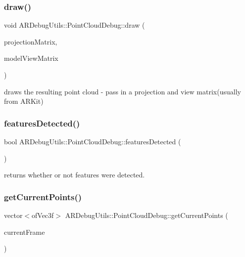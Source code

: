 \subsubsection{\texorpdfstring{draw()}{draw()}}
{\footnotesize\ttfamily void A\+R\+Debug\+Utils\+::\+Point\+Cloud\+Debug\+::draw (\begin{DoxyParamCaption}\item[{of\+Matrix4x4}]{projection\+Matrix,  }\item[{of\+Matrix4x4}]{model\+View\+Matrix }\end{DoxyParamCaption})\hspace{0.3cm}{\ttfamily [inline]}}



draws the resulting point cloud -\/ pass in a projection and view matrix(usually from A\+R\+Kit) 

\mbox{\label{class_a_r_debug_utils_1_1_point_cloud_debug_abfaa58360f92ad1b41692175107c99a8}} 
\subsubsection{\texorpdfstring{features\+Detected()}{featuresDetected()}}
{\footnotesize\ttfamily bool A\+R\+Debug\+Utils\+::\+Point\+Cloud\+Debug\+::features\+Detected (\begin{DoxyParamCaption}{ }\end{DoxyParamCaption})\hspace{0.3cm}{\ttfamily [inline]}}



returns whether or not features were detected. 

\mbox{\label{class_a_r_debug_utils_1_1_point_cloud_debug_a62e8829bd3cdcc822fda0962e1abcac9}} 
\subsubsection{\texorpdfstring{get\+Current\+Points()}{getCurrentPoints()}}
{\footnotesize\ttfamily vector$<$of\+Vec3f$>$ A\+R\+Debug\+Utils\+::\+Point\+Cloud\+Debug\+::get\+Current\+Points (\begin{DoxyParamCaption}\item[{A\+R\+Frame $\ast$}]{current\+Frame }\end{DoxyParamCaption})\hspace{0.3cm}{\ttfamily [inline]}}


